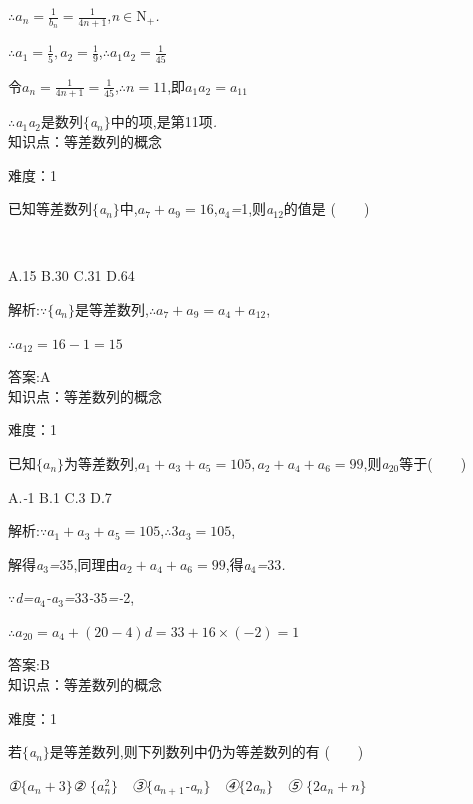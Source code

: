 \documentclass{article} %
\begin{document}
$\therefore a_n = \frac{1}{b_n} = \frac{1}{4n+1}$,\textit{n}$\mathrm{\in}$N\textit{${}_{+}$.}

$\therefore a_1 = \frac{1}{5}, a_2 = \frac{1}{9}$,$\therefore a_1 a_2 = \frac{1}{45}$

令$a_n = \frac{1}{4n+1} = \frac{1}{45}$,$\therefore n = 11$,即$a_1 a_2 = a_{11}$

\textit{$\therefore$a}${}_{1}$\textit{a}${}_{2}$是数列$\mathrm{\{}$\textit{a${}_{n}$}$\mathrm{\}}$中的项,是第11项\textit{.} \\

知识点：等差数列的概念

难度：1

 已知等差数列$\mathrm{\{}$\textit{a${}_{n}$}$\mathrm{\}}$中,$a_7+a_9 = 16$,\textit{a}${}_{4}$\textit{=}1,则\textit{a}${}_{12}$的值是 (\textit{　　})

 \textit{　　　　　　　　　　　　　　　　}

 A.15 B.30 C.31 D.64

 解析:\textit{$\because$}$\mathrm{\{}$\textit{a${}_{n}$}$\mathrm{\}}$是等差数列,$\therefore a_7 + a_9 = a_4 + a_{12}$,

$\therefore a_{12} = 16 -1= 15$
  
 答案:A \\

知识点：等差数列的概念

难度：1

 已知$\{a_n\}$为等差数列,$a_1+a_3+a_5 = 105, a_2+a_4+a_6 = 99$,则\textit{a}${}_{20}$等于(\textit{　　})

 A.\textit{-}1 B.1 C.3 D.7

 解析:$\because a_1 + a_3 + a_5 = 105$,$\therefore 3a_3=105$,

解得\textit{a}${}_{3}$\textit{=}35,同理由$a_2+a_4+a_6 = 99$,得\textit{a}${}_{4}$\textit{=}33\textit{.}

\textit{$\because$d=a}${}_{4}$\textit{-a}${}_{3}$\textit{=}33\textit{-}35\textit{=-}2,

$\therefore a_{20} = a_4 + (20-4)d = 33+16\times (-2) = 1$

 答案:B \\

知识点：等差数列的概念

难度：1

 若$\mathrm{\{}$\textit{a${}_{n}$}$\mathrm{\}}$是等差数列,则下列数列中仍为等差数列的有 (\textit{　　})

 \textit{①}$\{a_n+3\}$\textit{② }$\{a_n^2\}$\textit{　③}$\mathrm{\{}$\textit{a${}_{n+}$}${}_{1}$\textit{-a${}_{n}$}$\mathrm{\}}$\textit{　④}$\mathrm{\{}$2\textit{a${}_{n}$}$\mathrm{\}}$\textit{　⑤} $\{2a_n+n\}$
\end{document}

